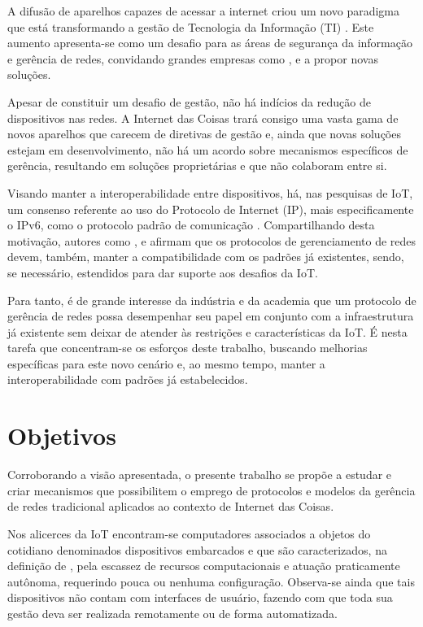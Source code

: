 \documentclass[twoside,english,brazilian]{UNISINOSmonografia}
\begin{document}
	A difusão de aparelhos capazes de acessar a internet criou um novo 
	paradigma que está transformando a gestão de Tecnologia da Informação (TI) 
	\cite{ZdnetBYOD}.
	Este aumento apresenta-se como um desafio para as áreas de segurança da 
	informação e gerência de redes, convidando grandes empresas como 
	,  e  a 
	propor novas soluções.
	
	Apesar de constituir um desafio de gestão, não há indícios da redução de 
	dispositivos nas redes. A Internet das Coisas trará consigo uma vasta gama 
	de novos aparelhos que carecem de diretivas de gestão \cite{Atzori2010b} 
	e, ainda que novas soluções estejam em desenvolvimento, não há um acordo 
	sobre mecanismos específicos de gerência, resultando em soluções 
	proprietárias e que não colaboram entre si.
	
	Visando manter a interoperabilidade entre dispositivos, há, nas pesquisas 
	de IoT, um consenso referente ao uso do Protocolo de Internet (IP), mais 
	especificamente o IPv6, como o protocolo padrão de comunicação 
	\cite{Dunkels2008,Mattern2010a,Feng2011,Paventhan2012}.
	Compartilhando desta motivação, autores como , 
	 e 
	afirmam que os protocolos de gerenciamento de redes devem, também, manter 
	a compatibilidade com os padrões já existentes, sendo, se necessário, 
	estendidos para dar suporte aos desafios da IoT.
	
	Para tanto, é de grande interesse da indústria e da academia que um 
	protocolo de gerência de redes possa desempenhar seu papel em conjunto com 
	a infraestrutura já existente sem deixar de atender às restrições e 
	características da IoT. É nesta tarefa que concentram-se os esforços deste 
	trabalho, buscando melhorias específicas para este novo cenário e, ao 
	mesmo tempo, manter a interoperabilidade com padrões já estabelecidos.
	
\section{Objetivos}

	Corroborando a visão apresentada, o presente trabalho se propõe a estudar 
	e 
	criar mecanismos que possibilitem o emprego de protocolos e modelos da 
	gerência de redes tradicional aplicados ao contexto de Internet das 
	Coisas. 
	
	Nos alicerces da IoT encontram-se computadores associados a objetos do 
	cotidiano denominados dispositivos embarcados e que são caracterizados, 
	na definição de , pela escassez de recursos 
	computacionais e atuação praticamente autônoma, requerindo pouca ou 
	nenhuma configuração.
	Observa-se ainda que tais dispositivos não contam 
	com interfaces de usuário, fazendo com que toda sua gestão deva ser 
	realizada remotamente ou de forma automatizada. 
\end{document}
